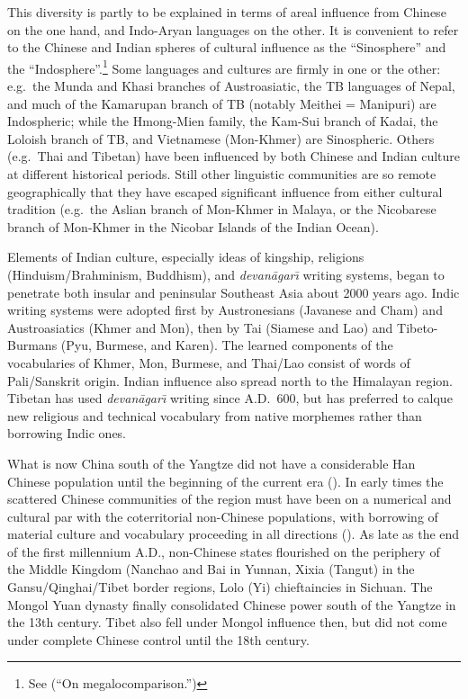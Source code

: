 This diversity is partly to be explained in terms of areal influence from Chinese on the one hand, and Indo-Aryan languages on the other. It is convenient to refer to the Chinese and Indian spheres of cultural influence as the “Sinosphere” and the “Indosphere”.\footnote{See \citealt{JAM-OM} (“On megalocomparison.”)} Some languages and cultures are firmly in one or the other: e.g.\ the Munda and Khasi branches of Austroasiatic, the TB languages of Nepal, and much of the Kamarupan branch of TB (notably Meithei = Manipuri) are Indospheric; while the Hmong-Mien family, the Kam-Sui branch of Kadai, the Loloish branch of TB, and Vietnamese (Mon-Khmer) are Sinospheric. Others (e.g.\ Thai and Tibetan) have been influenced by both Chinese and Indian culture at different historical periods. Still other linguistic communities are so remote geographically that they have escaped significant influence from either cultural tradition (e.g.\ the Aslian branch of Mon-Khmer in Malaya, or the Nicobarese branch of Mon-Khmer in the Nicobar Islands of the Indian Ocean).

Elements of Indian culture, especially ideas of kingship, religions (Hinduism/Brahminism, Buddhism), and {\it devan\=agar\={\i}} writing systems, began to penetrate both insular and peninsular Southeast Asia about 2000 years ago. Indic writing systems were adopted first by Austronesians (Javanese and Cham) and Austroasiatics (Khmer and Mon), then by Tai (Siamese and Lao) and Tibeto-Burmans (Pyu, Burmese, and Karen). The learned components of the vocabularies of Khmer, Mon, Burmese, and Thai/Lao consist of words of Pali/Sanskrit origin. Indian influence also spread north to the Himalayan region. Tibetan has used {\it devan\=agar\={\i}} writing since A.D.\ 600, but has preferred to calque new religious and technical vocabulary from native morphemes rather than borrowing Indic ones.

What is now China south of the Yangtze did not have a considerable Han Chinese population until the beginning of the current era (\citealt{RR-LOC,JN-Chinese}). In early times the scattered Chinese communities of the region must have been on a numerical and cultural par with the coterritorial non-Chinese populations, with borrowing of material culture and vocabulary proceeding in all directions (\citealt{PKB-ATLC,MN-AASC,LS-CAGR}). As late as the end of the first millennium A.D., non-Chinese states flourished on the periphery of the Middle Kingdom (Nanchao and Bai in Yunnan, Xixia (Tangut) in the Gansu/Qinghai/Tibet border regions, Lolo (Yi) chieftaincies in Sichuan. The Mongol Yuan dynasty finally consolidated Chinese power south of the Yangtze in the 13th century. Tibet also fell under Mongol influence then, but did not come under complete Chinese control until the 18th century.

